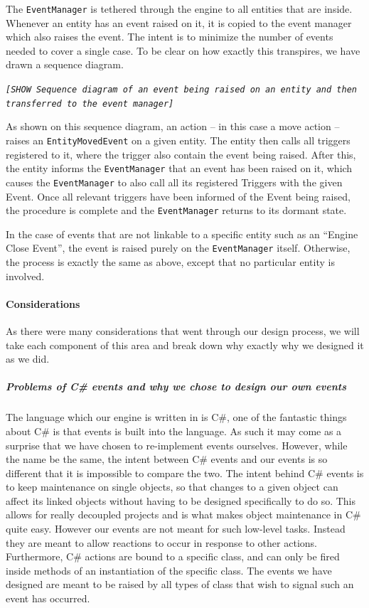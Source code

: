 The \texttt{EventManager} is tethered through the engine to all entities
that are inside. Whenever an entity has an event raised on it, it
is copied to the event manager which also raises the event. The intent
is to minimize the number of events needed to cover a single case.
To be clear on how exactly this transpires, we have drawn a sequence
diagram.

\texttt{\emph{{[}SHOW Sequence diagram of an event being raised on
an entity and then transferred to the event manager{]}}}

As shown on this sequence diagram, an action -- in this case a move
action -- raises an \texttt{EntityMovedEvent} on a given entity. The
entity then calls all triggers registered to it, where the trigger
also contain the event being raised. After this, the entity informs
the \texttt{EventManager} that an event has been raised on it, which
causes the \texttt{EventManager} to also call all its registered Triggers
with the given Event. Once all relevant triggers have been informed
of the Event being raised, the procedure is complete and the \texttt{EventManager}
returns to its dormant state.

In the case of events that are not linkable to a specific entity such
as an \textquotedblleft{}Engine Close Event\textquotedblright{}, the
event is raised purely on the \texttt{EventManager} itself. Otherwise,
the process is exactly the same as above, except that no particular
entity is involved.


\paragraph*{Considerations}

As there were many considerations that went through our design process,
we will take each component of this area and break down why exactly
why we designed it as we did.


\subparagraph*{Problems of C\# events and why we chose to design our own events}

The language which our engine is written in is C\#, one of the fantastic
things about C\# is that events is built into the language. As such
it may come as a surprise that we have chosen to re-implement events
ourselves. However, while the name be the same, the intent between
C\# events and our events is so different that it is impossible to
compare the two. The intent behind C\# events is to keep maintenance
on single objects, so that changes to a given object can affect its
linked objects without having to be designed specifically to do so.
This allows for really decoupled projects and is what makes object
maintenance in C\# quite easy. However our events are not meant for
such low-level tasks. Instead they are meant to allow reactions to
occur in response to other actions. Furthermore, C\# actions are bound
to a specific class, and can only be fired inside methods of an instantiation
of the specific class. The events we have designed are meant to be
raised by all types of class that wish to signal such an event has
occurred.

